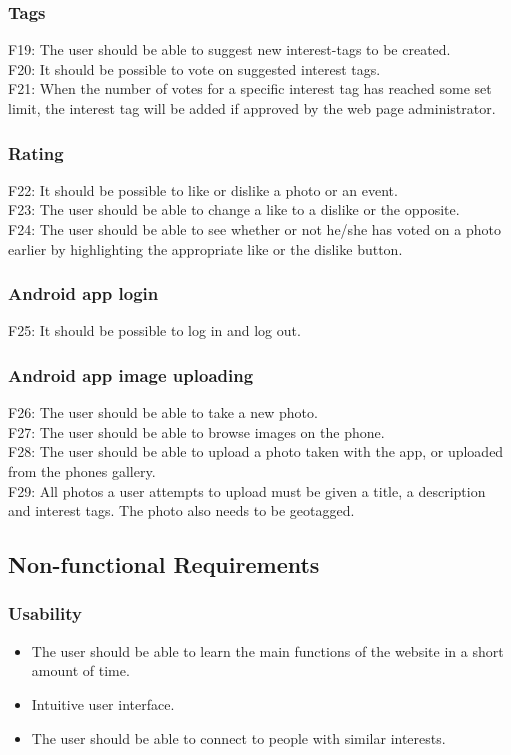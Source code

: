 \subsubsection{Tags}
F19: The user should be able to suggest new interest-tags to be created.\\
F20: It should be possible to vote on suggested interest tags.\\
F21: When the number of votes for a specific interest tag has reached some set limit, the interest tag will be added if approved by the web page administrator.

\subsubsection{Rating}
F22: It should be possible to like or dislike a photo or an event.\\
F23: The user should be able to change a like to a dislike or the opposite.\\
F24: The user should be able to see whether or not he/she has voted on a photo earlier by highlighting the appropriate like or the dislike button.

\subsubsection{Android app login}
F25: It should be possible to log in and log out.

\subsubsection{Android app image uploading}
F26: The user should be able to take a new photo. \\
F27: The user should be able to browse images on the phone. \\
F28: The user should be able to upload a photo taken with the app, or uploaded from the phones gallery. \\
F29: All photos a user attempts to upload must be given a title, a description and interest tags. The photo also needs to be geotagged.


\subsection{Non-functional Requirements}
\label{subsec:SysReqReqsNonFunc}

\subsubsection{Usability}
\begin{itemize}
    \item The user should be able to learn the main functions of the website in a short amount of time.
    \item Intuitive user interface.
    \item The user should be able to connect to people with similar interests.
\end{itemize}

